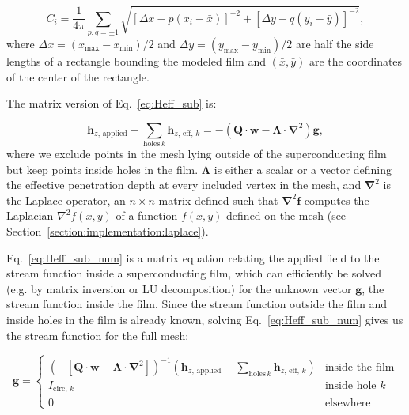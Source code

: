 \documentclass[preprint,12pt]{elsarticle}
\newcounter{bla}
\begin{document}
\begin{equation}
    \label{eq:C_vector}
    C_i = \frac{1}{4\pi}\sum_{p,q=\pm1}\sqrt{[\Delta x - p(x_i-\bar{x})]^{-2} + [\Delta y - q(y_i-\bar{y})]^{-2}},
\end{equation}
where $\Delta x=(x_\mathrm{max}-x_\mathrm{min})/2$ and $\Delta y=(y_\mathrm{max}-y_\mathrm{min})/2$ are half the side lengths of a rectangle bounding the modeled film and $(\bar{x}, \bar{y})$ are the coordinates of the center of the rectangle.

The matrix version of Eq.~\ref{eq:Heff_sub} is:

\begin{equation}
    \label{eq:Heff_sub_num}
     \mathbf{h}_{z,\,\mathrm{applied}} - \sum_{\mathrm{holes}\, k}\mathbf{h}_{z,\,\mathrm{eff},\,k} = -(\mathbf{Q}\cdot\mathbf{w}-\mathbf{\Lambda}\cdot\mathbf{\nabla}^2)\mathbf{g},
\end{equation}
where we exclude points in the mesh lying outside of the superconducting film but keep points
inside holes in the film. $\mathbf{\Lambda}$ is either a scalar or a vector defining the effective penetration depth at every included vertex in the mesh, and $\mathbf{\nabla}^2$
is the Laplace operator, an $n\times n$ matrix defined such that $\mathbf{\nabla}^2\mathbf{f}$ computes the Laplacian $\nabla^2f(x,y)$ of a function $f(x,y)$ defined on the mesh  (see Section~\ref{section:implementation:laplace}).

Eq.~\ref{eq:Heff_sub_num} is a matrix equation relating the applied field to the stream function
inside a superconducting film, which can efficiently be solved (e.g. by matrix inversion or LU decomposition) for the unknown vector $\mathbf{g}$, the stream function inside the film. Since the stream function outside the film and inside holes in the film is already known, solving Eq.~\ref{eq:Heff_sub_num} gives us the stream function for the full mesh:

\begin{equation}
    \label{eq:full_stream}
    \mathbf{g} = \begin{cases}
        \left(-[\mathbf{Q}\cdot\mathbf{w}-\mathbf{\Lambda}\cdot\mathbf{\nabla}^2]\right)^{-1}
        \left(\mathbf{h}_{z,\,\mathrm{applied}} - \sum_{\mathrm{holes}\,k}\mathbf{h}_{z,\,\mathrm{eff},\,k}\right)
            & \text{inside the film}\\
        I_{\mathrm{circ},\,k}
            & \text{inside hole }k\\
        0
            & \text{elsewhere}
    \end{cases}
\end{equation}
\end{document}
